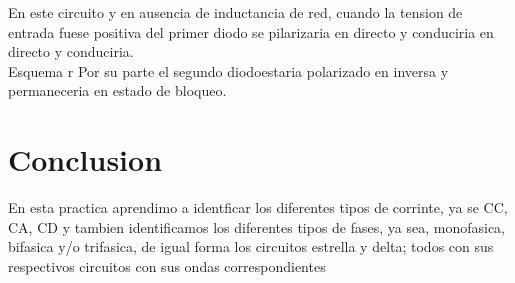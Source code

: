 \documentclass[12pt,a4paper]{report}
\begin{document}
En este circuito y en ausencia de inductancia de red, cuando la tension de entrada fuese positiva del primer diodo se pilarizaria en directo y conduciria en directo y conduciria.\\Esquema r
Por su parte el segundo diodoestaria polarizado en inversa y permaneceria en estado de bloqueo. 

\section{Conclusion}
En esta practica aprendimo a identficar los diferentes tipos de corrinte, ya se CC, CA, CD y tambien identificamos los diferentes tipos de fases, ya sea, monofasica, bifasica y/o trifasica, de igual forma los circuitos estrella y delta; todos con sus respectivos circuitos con sus ondas correspondientes
\end{document}
